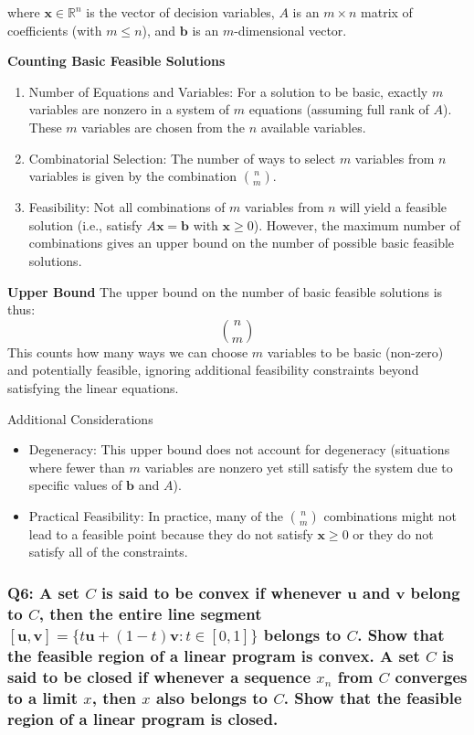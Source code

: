 \documentclass[8pt]{article}
\begin{document}
{where \( \mathbf{x} \in \mathbb{R}^n \) is the vector of decision variables, \( A \) is an \( m \times n \) matrix of coefficients (with \( m \leq n \)), and \( \mathbf{b} \) is an \( m \)-dimensional vector.

\textbf{Counting Basic Feasible Solutions}
\begin{enumerate}
    \item Number of Equations and Variables: For a solution to be basic, exactly \( m \) variables are nonzero in a system of \( m \) equations (assuming full rank of \( A \)). These \( m \) variables are chosen from the \( n \) available variables.
    \item Combinatorial Selection: The number of ways to select \( m \) variables from \( n \) variables is given by the combination \( \binom{n}{m} \).
    \item Feasibility: Not all combinations of \( m \) variables from \( n \) will yield a feasible solution (i.e., satisfy \( A\mathbf{x} = \mathbf{b} \) with \( \mathbf{x} \geq 0 \)). However, the maximum number of combinations gives an upper bound on the number of possible basic feasible solutions.
\end{enumerate}

\textbf{Upper Bound}
The upper bound on the number of basic feasible solutions is thus:
\[
\binom{n}{m}
\]
This counts how many ways we can choose \( m \) variables to be basic (non-zero) and potentially feasible, ignoring additional feasibility constraints beyond satisfying the linear equations.

Additional Considerations
\begin{itemize}
    \item Degeneracy: This upper bound does not account for degeneracy (situations where fewer than \( m \) variables are nonzero yet still satisfy the system due to specific values of \( \mathbf{b} \) and \( A \)).
    \item Practical Feasibility: In practice, many of the \( \binom{n}{m} \) combinations might not lead to a feasible point because they do not satisfy \( \mathbf{x} \geq 0 \) or they do not satisfy all of the constraints.
\end{itemize}


\subsubsection*{Q6: A set \(C\) is said to be convex if whenever \(\mathbf{u}\) and \(\mathbf{v}\) belong to \(C\), then the entire line segment \([\mathbf{u}, \mathbf{v}] = \{t \mathbf{u} + (1 - t) \mathbf{v} : t \in [0, 1]\}\) belongs to \(C\). Show that the feasible region of a linear program is convex. A set \(C\) is said to be closed if whenever a sequence \(x_n\) from \(C\) converges to a limit \(x\), then \(x\) also belongs to \(C\). Show that the feasible region of a linear program is closed.}

}
\end{document}
